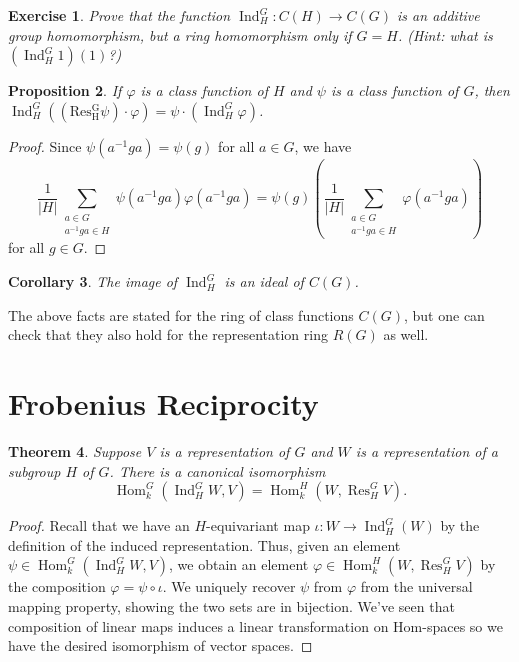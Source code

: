 \documentclass[12pt]{article}
\theoremstyle{plain}
\newtheorem{theorem}{Theorem}[section]
\newtheorem{proposition}[theorem]{Proposition}
\newtheorem{corollary}[theorem]{Corollary}
\newtheorem{exercise}[theorem]{Exercise}
\theoremstyle{definition}
\theoremstyle{remark}
\numberwithin{equation}{section}
\begin{document}
\begin{exercise}
Prove that the function
$\operatorname{Ind}_H^G : C(H) \to C(G)$
is an additive group homomorphism,
but a ring homomorphism only if $G=H$.
(Hint: what is $(\operatorname{Ind}_H^G 1)(1)$?)
\end{exercise}

\begin{proposition}
If $\varphi$ is a class function of $H$ and $\psi$ is a class function
of $G$, then
$\operatorname{Ind}^G_H ( (\operatorname{Res^G_H} \psi) \cdot\varphi)
= \psi \cdot (\operatorname{Ind}^G_H \varphi)$.
\end{proposition}

\begin{proof}
Since $\psi(a^{-1}ga)=\psi(g)$ for all $a \in G$, we have
\[
\frac{1}{|H|}\sum_{\substack{a \in G\\a^{-1}ga \in H}} \psi(a^{-1}ga)\varphi(a^{-1}ga)
 =
 \psi(g) \left(\frac{1}{|H|}\sum_{\substack{a \in G\\a^{-1}ga \in H}} \varphi(a^{-1}ga)
\right)
\]
for all $g \in G$.
\end{proof}

\begin{corollary}
The image of $\operatorname{Ind}^G_H$ is an ideal of $C(G)$.
\end{corollary}

The above facts are stated for the ring of class functions
$C(G)$, but one can check that they also hold for the representation
ring $R(G)$ as well.

\section{Frobenius Reciprocity}

\begin{theorem}
Suppose $V$ is a representation of $G$
and $W$ is a representation of a subgroup $H$ of $G$.
There is a canonical isomorphism
\[
\operatorname{Hom}^G_k(\operatorname{Ind}_H^G W, V) =
\operatorname{Hom}^H_k(W,\operatorname{Res}_H^G  V).
\]
\end{theorem}

\begin{proof}
Recall that we have an $H$-equivariant map
$\iota : W \to \operatorname{Ind}_H^G(W)$ by the definition of the
induced representation.
Thus, given an element
$\psi \in \operatorname{Hom}^G_k(\operatorname{Ind}_H^G W, V)$,
we obtain an element
$\varphi \in \operatorname{Hom}^H_k(W,\operatorname{Res}_H^G  V)$
by the composition $\varphi = \psi \circ \iota$.
We uniquely recover $\psi$ from $\varphi$ from the universal mapping
property, showing the two sets are in bijection.
We've seen that composition of linear maps induces a linear
transformation on Hom-spaces so we have the desired isomorphism
of vector spaces.
\end{proof}
\end{document}
